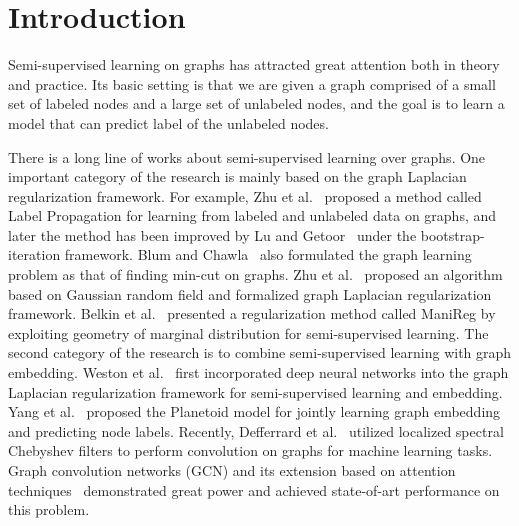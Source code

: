\section{Introduction}\label{sec:intro}


Semi-supervised learning on graphs has attracted great attention  both in theory and practice. 
Its basic setting is that we
are given a graph comprised of a small set of labeled nodes and a large set of unlabeled nodes, and the goal is to learn a model that can predict label of the unlabeled nodes.

There is a long line of works about semi-supervised learning over graphs. 
One important category of the research is mainly based on the graph Laplacian regularization framework. 
For example, 
Zhu et al.~ proposed a method called Label Propagation for learning from labeled and unlabeled data on graphs, and later the method has been improved by Lu and Getoor~ under the bootstrap-iteration framework.
Blum and Chawla~ also formulated the graph learning problem  as that of finding min-cut on graphs. 
Zhu et al.~ proposed an algorithm based on Gaussian random field and formalized graph Laplacian regularization framework. 
Belkin et al.~ presented a 
regularization method called ManiReg by exploiting geometry of marginal distribution for semi-supervised learning. 
The second category of the research is to combine semi-supervised learning with graph embedding.
Weston et al.~ first incorporated deep neural networks into the graph Laplacian regularization framework for semi-supervised learning and embedding. Yang et al.~ proposed the Planetoid model for jointly learning graph embedding and predicting node labels. Recently, Defferrard et al.~ utilized localized spectral Chebyshev filters to perform convolution on graphs for machine learning tasks. Graph convolution networks (GCN) \cite{kipf2016semi} and its extension based on attention techniques~\cite{DBLP:journals/corr/abs-1710-10903} demonstrated great power and achieved state-of-art performance on this problem.  

